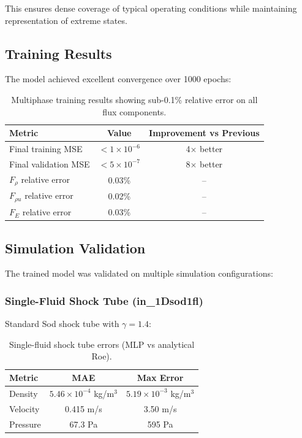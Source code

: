 \documentclass[11pt,a4paper]{article}
\begin{document}
This ensures dense coverage of typical operating conditions while maintaining representation of extreme states.

\subsection{Training Results}

The model achieved excellent convergence over 1000 epochs:

\begin{table}[H]
\centering
\begin{tabular}{lcc}
\toprule
Metric & Value & Improvement vs Previous \\
\midrule
Final training MSE & $<1 \times 10^{-6}$ & 4$\times$ better \\
Final validation MSE & $<5 \times 10^{-7}$ & 8$\times$ better \\
$F_\rho$ relative error & 0.03\% & -- \\
$F_{\rho u}$ relative error & 0.02\% & -- \\
$F_E$ relative error & 0.03\% & -- \\
\bottomrule
\end{tabular}
\caption{Multiphase training results showing sub-0.1\% relative error on all flux components.}
\label{tab:multiphase_results}
\end{table}

\subsection{Simulation Validation}

The trained model was validated on multiple simulation configurations:

\subsubsection{Single-Fluid Shock Tube (in\_1Dsod1fl)}

Standard Sod shock tube with $\gamma = 1.4$:

\begin{table}[H]
\centering
\begin{tabular}{lcc}
\toprule
Metric & MAE & Max Error \\
\midrule
Density & $5.46 \times 10^{-4}$ kg/m$^3$ & $5.19 \times 10^{-3}$ kg/m$^3$ \\
Velocity & 0.415 m/s & 3.50 m/s \\
Pressure & 67.3 Pa & 595 Pa \\
\bottomrule
\end{tabular}
\caption{Single-fluid shock tube errors (MLP vs analytical Roe).}
\label{tab:single_fluid}
\end{table}
\end{document}
